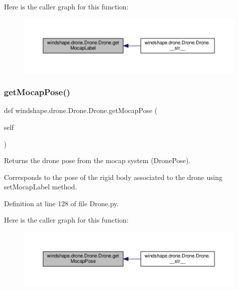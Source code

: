 Here is the caller graph for this function\+:\nopagebreak
\begin{figure}[H]
\begin{center}
\leavevmode
\includegraphics[width=350pt]{classwindshape_1_1drone_1_1_drone_1_1_drone_ac29dae974ab7bb13d250dbb752e20853_icgraph}
\end{center}
\end{figure}
\mbox{\label{classwindshape_1_1drone_1_1_drone_1_1_drone_aff00e3bde6aa9347331f92135644edd2}} 
\subsubsection{\texorpdfstring{get\+Mocap\+Pose()}{getMocapPose()}}
{\footnotesize\ttfamily def windshape.\+drone.\+Drone.\+Drone.\+get\+Mocap\+Pose (\begin{DoxyParamCaption}\item[{}]{self }\end{DoxyParamCaption})}

\begin{DoxyVerb}Returns the drone pose from the mocap system (DronePose).

Corresponds to the pose of the rigid body associated to the
drone using setMocapLabel method.
\end{DoxyVerb}
 

Definition at line 128 of file Drone.\+py.

Here is the caller graph for this function\+:\nopagebreak
\begin{figure}[H]
\begin{center}
\leavevmode
\includegraphics[width=350pt]{classwindshape_1_1drone_1_1_drone_1_1_drone_aff00e3bde6aa9347331f92135644edd2_icgraph}
\end{center}
\end{figure}
\mbox{\label{classwindshape_1_1drone_1_1_drone_1_1_drone_a7e7eced60d10a8b1eb38b7ebf6a02f0f}} 
